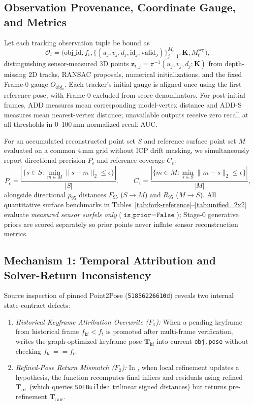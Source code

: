 \documentclass{evidencescene}
\begin{document}
\subsection{Observation Provenance, Coordinate Gauge, and Metrics}
Let each tracking observation tuple be bound as
\begin{equation}
    \mathcal{O}_t=\big(\text{obj\_id},f_t,\{(u_j,v_j,d_j,\text{id}_j,\text{valid}_j)\}_{j=1}^{M_t},\mathbf{K},M_t^{\mathrm{seg}}\big),
\end{equation}
distinguishing sensor-measured 3D points $\mathbf{z}_{t,j}=\pi^{-1}(u_j,v_j,d_j;\mathbf{K})$ from depth-missing 2D tracks, RANSAC proposals, numerical initializations, and the fixed Frame-0 gauge $O_{\mathrm{obj}_0}$. Each tracker's initial gauge is aligned once using the first reference pose, with Frame 0 excluded from score denominators. For post-initial frames, ADD measures mean corresponding model-vertex distance and ADD-S measures mean nearest-vertex distance; unavailable outputs receive zero recall at all thresholds in $0$--$100\,\mathrm{mm}$ normalized recall AUC.

For an accumulated reconstructed point set $S$ and reference surface point set $M$ evaluated on a common $4\,\mathrm{mm}$ grid without ICP drift masking, we simultaneously report directional precision $P_\epsilon$ and reference coverage $C_\epsilon$:
\begin{equation}
    P_\epsilon = \frac{|\{s\in S:\min_{m\in M}\|s-m\|_2\le\epsilon\}|}{|S|}, \qquad
    C_\epsilon = \frac{|\{m\in M:\min_{s\in S}\|m-s\|_2\le\epsilon\}|}{|M|},
\end{equation}
alongside directional $p_{95}$ distances $F_{95}$ ($S\to M$) and $R_{95}$ ($M\to S$). All quantitative surface benchmarks in Tables~\ref{tab:fork-reference}--\ref{tab:unified_2x2} evaluate \emph{measured sensor surfels only} ($\texttt{is\_prior}=\texttt{False}$); Stage-0 generative priors are scored separately so prior points never inflate sensor reconstruction metrics.

\subsection{Mechanism 1: Temporal Attribution and Solver-Return Inconsistency}
Source inspection of pinned Point2Pose (\texttt{51856226610d}) reveals two internal state-contract defects:
\begin{enumerate}
    \item \emph{Historical Keyframe Attribution Overwrite ($F_1$):} When a pending keyframe from historical frame $f_{\mathrm{kf}}<f_t$ is promoted after multi-frame verification,  writes the graph-optimized keyframe pose $\mathbf{T}_{\mathrm{kf}}$ into current \texttt{obj.pose} without checking $f_{\mathrm{kf}}==f_t$.
    \item \emph{Refined-Pose Return Mismatch ($F_2$):} In , when local refinement updates a hypothesis, the function recomputes final inliers and residuals using refined $\mathbf{T}_{\mathrm{ref}}$ (which queries \texttt{SDFBuilder} trilinear signed distances) but returns pre-refinement $\mathbf{T}_{\mathrm{raw}}$.
\end{enumerate}
\end{document}
